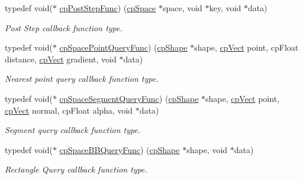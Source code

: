 \begin{DoxyCompactItemize}
\mbox{\label{group__cpSpace_ga93e9005e387fec86eeb4a225ac295a23}} 
typedef void($\ast$ \hyperlink{group__cpSpace_ga93e9005e387fec86eeb4a225ac295a23}{cp\+Post\+Step\+Func}) (\hyperlink{structcpSpace}{cp\+Space} $\ast$space, void $\ast$key, void $\ast$data)
\begin{DoxyCompactList}\small\item\em Post Step callback function type. \end{DoxyCompactList}\item 
\mbox{\label{group__cpSpace_ga646a55f0937f07c19b24561ed5341221}} 
typedef void($\ast$ \hyperlink{group__cpSpace_ga646a55f0937f07c19b24561ed5341221}{cp\+Space\+Point\+Query\+Func}) (\hyperlink{structcpShape}{cp\+Shape} $\ast$shape, \hyperlink{structcpVect}{cp\+Vect} point, cp\+Float distance, \hyperlink{structcpVect}{cp\+Vect} gradient, void $\ast$data)
\begin{DoxyCompactList}\small\item\em Nearest point query callback function type. \end{DoxyCompactList}\item 
\mbox{\label{group__cpSpace_ga9046beaeba5728c5e954f0f1dc2ae130}} 
typedef void($\ast$ \hyperlink{group__cpSpace_ga9046beaeba5728c5e954f0f1dc2ae130}{cp\+Space\+Segment\+Query\+Func}) (\hyperlink{structcpShape}{cp\+Shape} $\ast$shape, \hyperlink{structcpVect}{cp\+Vect} point, \hyperlink{structcpVect}{cp\+Vect} normal, cp\+Float alpha, void $\ast$data)
\begin{DoxyCompactList}\small\item\em Segment query callback function type. \end{DoxyCompactList}\item 
\mbox{\label{group__cpSpace_ga02779238e9b8c07797aae6139fad203c}} 
typedef void($\ast$ \hyperlink{group__cpSpace_ga02779238e9b8c07797aae6139fad203c}{cp\+Space\+B\+B\+Query\+Func}) (\hyperlink{structcpShape}{cp\+Shape} $\ast$shape, void $\ast$data)
\begin{DoxyCompactList}\small\item\em Rectangle Query callback function type. \end{DoxyCompactList}\item 
\mbox{\label{group__cpSpace_gab124952dd71dea36688f6ff6ff8bdcb2}} 

\end{DoxyCompactItemize}
